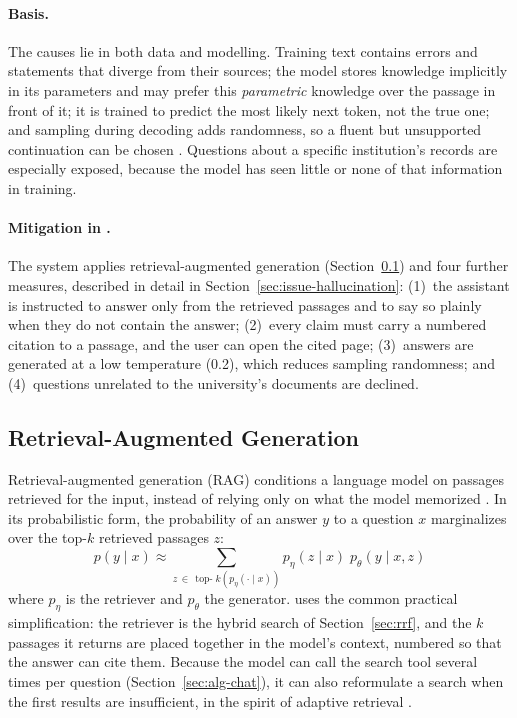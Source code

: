 \paragraph{Basis.} The causes lie in both data and modelling. Training text contains errors and statements that diverge from their sources; the model stores knowledge implicitly in its parameters and may prefer this \emph{parametric} knowledge over the passage in front of it; it is trained to predict the most likely next token, not the true one; and sampling during decoding adds randomness, so a fluent but unsupported continuation can be chosen \citep{ji2023hallucination}. Questions about a specific institution's records are especially exposed, because the model has seen little or none of that information in training.

\paragraph{Mitigation in \cs{}.} The system applies retrieval-augmented generation (Section~\ref{sec:rag}) and four further measures, described in detail in Section~\ref{sec:issue-hallucination}: (1)~the assistant is instructed to answer only from the retrieved passages and to say so plainly when they do not contain the answer; (2)~every claim must carry a numbered citation to a passage, and the user can open the cited page; (3)~answers are generated at a low temperature (0.2), which reduces sampling randomness; and (4)~questions unrelated to the university's documents are declined.

\subsection{Retrieval-Augmented Generation}\label{sec:rag}

Retrieval-augmented generation (RAG) conditions a language model on passages retrieved for the input, instead of relying only on what the model memorized \citep{lewis2020rag}. In its probabilistic form, the probability of an answer $y$ to a question $x$ marginalizes over the top-$k$ retrieved passages $z$:
\begin{equation}
  p(y \mid x) \approx \sum_{z \,\in\, \operatorname{top-}k\left(p_{\eta}(\cdot \mid x)\right)} p_{\eta}(z \mid x)\; p_{\theta}(y \mid x, z) \label{eq:rag}
\end{equation}
where $p_{\eta}$ is the retriever and $p_{\theta}$ the generator. \cs{} uses the common practical simplification: the retriever is the hybrid search of Section~\ref{sec:rrf}, and the $k$ passages it returns are placed together in the model's context, numbered so that the answer can cite them. Because the model can call the search tool several times per question (Section~\ref{sec:alg-chat}), it can also reformulate a search when the first results are insufficient, in the spirit of adaptive retrieval \citep{asai2023selfrag,jeong2024adaptiverag}.

